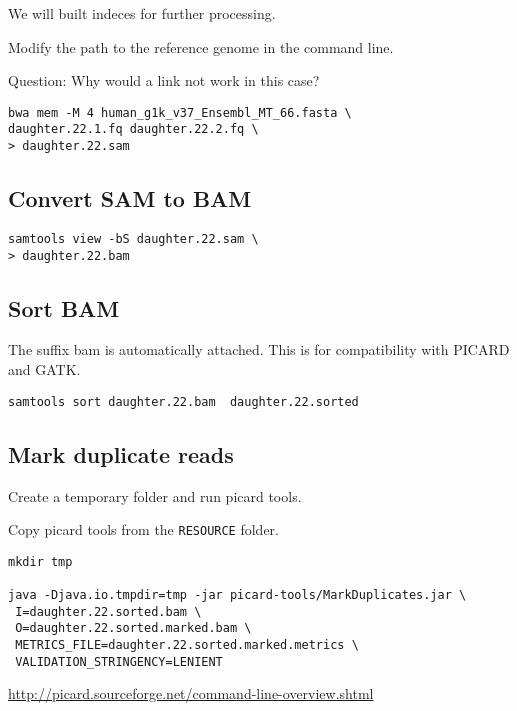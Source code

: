 \documentclass{article}
\begin{document}
We will built indeces for further processing.

Modify the path to the reference genome in the command line. 

Question: Why would a link not work in this case?

\begin{verbatim}
bwa mem -M 4 human_g1k_v37_Ensembl_MT_66.fasta \
daughter.22.1.fq daughter.22.2.fq \
> daughter.22.sam
\end{verbatim}

\subsection{Convert SAM to BAM}
\begin{verbatim}
samtools view -bS daughter.22.sam \
> daughter.22.bam
\end{verbatim}
\subsection{Sort BAM}
The suffix bam is automatically attached. This is for compatibility with PICARD and GATK.

\begin{verbatim}
samtools sort daughter.22.bam  daughter.22.sorted 
\end{verbatim}

\subsection{Mark duplicate reads}

Create a temporary folder and run picard tools.

Copy picard tools from the \verb+RESOURCE+ folder.
\begin{verbatim}
mkdir tmp

java -Djava.io.tmpdir=tmp -jar picard-tools/MarkDuplicates.jar \
 I=daughter.22.sorted.bam \
 O=daughter.22.sorted.marked.bam \
 METRICS_FILE=daughter.22.sorted.marked.metrics \
 VALIDATION_STRINGENCY=LENIENT

\end{verbatim}        
\url{http://picard.sourceforge.net/command-line-overview.shtml}
\end{document}
